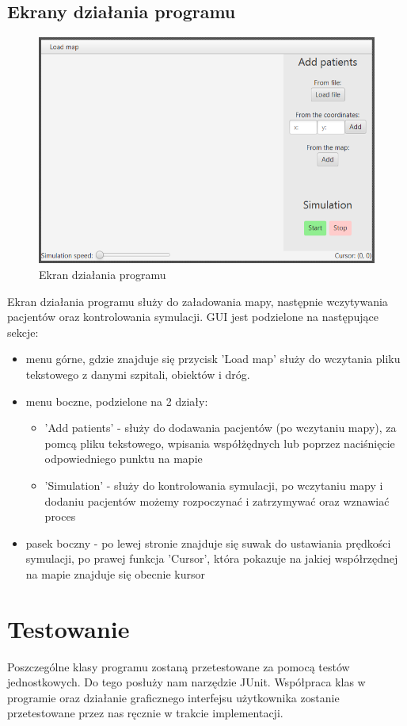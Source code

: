 \documentclass[]{article}
\begin{document}
    \subsection{Ekrany działania programu} %
    \begin{figure}[!h]
    \centering
    \includegraphics[width=15cm]{gui.jpg}
    \caption{Ekran działania programu}
    \label{fig:Shrek}
\end{figure}
Ekran działania programu służy do załadowania mapy, następnie wczytywania pacjentów oraz kontrolowania symulacji. GUI jest podzielone na następujące sekcje:
\begin{itemize}
    \item menu górne, gdzie znajduje się przycisk 'Load map' służy do wczytania pliku tekstowego z danymi szpitali, obiektów i dróg.
    \item menu boczne, podzielone na 2 działy: 
\begin{itemize}
    \item 'Add patients' - służy do dodawania pacjentów (po wczytaniu mapy), za pomcą pliku tekstowego, wpisania współżędnych lub poprzez naciśnięcie odpowiedniego punktu na mapie
    \item 'Simulation' - służy do kontrolowania symulacji, po wczytaniu mapy i dodaniu pacjentów możemy rozpoczynać i zatrzymywać oraz wznawiać proces
\end{itemize}
\item pasek boczny - po lewej stronie znajduje się suwak do ustawiania prędkości symulacji, po prawej funkcja 'Cursor', która pokazuje na jakiej współrzędnej na mapie znajduje się obecnie kursor 
\end{itemize}


    \section{Testowanie}
    Poszczególne klasy programu zostaną przetestowane za pomocą testów jednostkowych. Do tego posłuży nam narzędzie JUnit. Współpraca klas w programie oraz działanie graficznego interfejsu użytkownika zostanie przetestowane przez nas ręcznie w trakcie implementacji.
\end{document}
